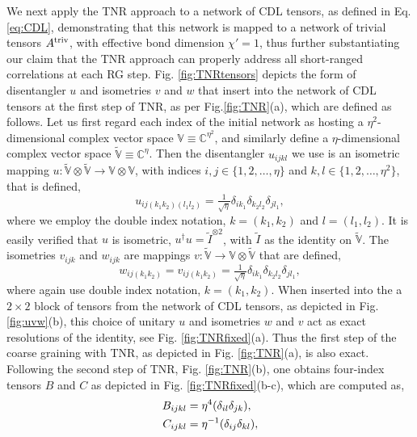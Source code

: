 \documentclass[aps,prl,twocolumn,showpacs,superscriptaddress,floatfix,10pt]{revtex4-1}
\def\TRI{\mbox{\scriptsize triv}}
\begin{document}
We next apply the TNR approach to a network of CDL tensors, as defined in Eq. \ref{eq:CDL}, demonstrating that this network is mapped to a network of trivial tensors $A^{\TRI}$, with effective bond dimension $\chi' = 1$, thus further substantiating our claim that the TNR approach can properly address all short-ranged correlations at each RG step. Fig. \ref{fig:TNRtensors} depicts the form of disentangler $u$ and isometries $v$ and $w$ that insert into the network of CDL tensors at the first step of TNR, as per Fig.\ref{fig:TNR}(a),
which are defined as follows. Let us first regard each index of the initial network as hosting a ${\eta}^2$-dimensional complex vector space $\mathbb{V} \equiv \mathbb{C}^{{\eta}^2}$, and similarly define a $\eta$-dimensional complex vector space  $\tilde{\mathbb{V}} \equiv \mathbb{C}^{\eta}$. Then the disentangler $u_{ijkl}$ we use is an isometric mapping $u: \tilde{\mathbb{V}}\otimes \tilde{\mathbb{V}} \rightarrow \mathbb{V} \otimes \mathbb{V}$, with indices $i,j\in\{1,2,\ldots,\eta \}$ and $k,l\in\{1,2,\ldots,{\eta}^2 \}$, that is defined,
\begin{equation} \label{eq:TNR1}
{u_{ij({k_1}{k_2})({l_1}{l_2})}} = \tfrac{1}{{\sqrt \eta }}{\delta _{i{k_1}}}{\delta _{{k_2}{l_2}}}{\delta _{j{l_1}}},
\end{equation}
where we employ the double index notation, $k=(k_1,k_2)$ and $l=(l_1,l_2)$. It is easily verified that $u$ is isometric, $u^{\dagger}u=\tilde{I}^{\otimes 2}$, with $\tilde{I}$ as the identity on $\tilde{\mathbb{V}}$. The isometries $v_{ijk}$ and $w_{ijk}$ are mappings $v: \tilde{\mathbb{V}} \rightarrow \mathbb{V} \otimes \tilde{\mathbb{V}}$ that are defined,
\begin{equation} \label{eq:TNR2}
{w_{ij({k_1}{k_2})}} = {v_{ij({k_1}{k_2})}} = \tfrac{1}{{\sqrt \eta }}{\delta _{i{k_1}}}{\delta _{{k_2}{l_2}}}{\delta _{j{l_1}}},
\end{equation}
where again use double index notation, $k=(k_1,k_2)$. When inserted into the a $2\times 2$ block of tensors from the network of CDL tensors, as depicted in Fig. \ref{fig:uvw}(b),
this choice of unitary $u$ and isometries $w$ and $v$ act as exact resolutions of the identity, see Fig. \ref{fig:TNRfixed}(a). Thus the first step of the coarse graining with TNR, as depicted in Fig. \ref{fig:TNR}(a),
is also exact. Following the second step of TNR, Fig. \ref{fig:TNR}(b),
one obtains four-index tensors $B$ and $C$ as depicted in Fig. \ref{fig:TNRfixed}(b-c), which are computed as,
\begin{align} \label{eq:TNR3}
  {B_{ijkl}} &= {\eta}^4({\delta _{il}}{\delta _{jk}}) \nonumber \hfill, \\
  {C_{ijkl}} &= {\eta}^{-1}({\delta _{ij}}{\delta _{kl}}) \hfill, 
\end{align}
\end{document}
